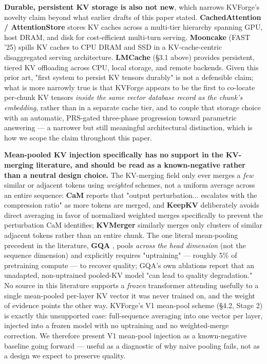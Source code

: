 \documentclass[10pt,twocolumn]{article}
\begin{document}
\textbf{Durable, persistent KV storage is also not new}, which narrows KVForge's novelty claim beyond what earlier drafts of this paper stated. \textbf{CachedAttention / AttentionStore} \cite{ref36} stores KV caches across a multi-tier hierarchy spanning GPU, host DRAM, and disk for cost-efficient multi-turn serving. \textbf{Mooncake} \cite{ref37} (FAST '25) spills KV caches to CPU DRAM and SSD in a KV-cache-centric disaggregated serving architecture. \textbf{LMCache} \cite{ref33} (\S{}3.1 above) provides persistent, tiered KV offloading across CPU, local storage, and remote backends. Given this prior art, "first system to persist KV tensors durably" is not a defensible claim; what is more narrowly true is that KVForge appears to be the first to co-locate per-chunk KV tensors \textit{inside the same vector database record as the chunk's embedding}, rather than in a separate cache tier, and to couple that storage choice with an automatic, PRS-gated three-phase progression toward parametric answering --- a narrower but still meaningful architectural distinction, which is how we scope the claim throughout this paper.


\textbf{Mean-pooled KV injection specifically has no support in the KV-merging literature, and should be read as a known-negative rather than a neutral design choice.} The KV-merging field only ever merges a \textit{few} similar or adjacent tokens using \textit{weighted} schemes, not a uniform average across an entire sequence: \textbf{CaM} \cite{ref40} reports that "output perturbation... escalates with the compression ratio" as more tokens are merged, and \textbf{KeepKV} \cite{ref42} deliberately avoids direct averaging in favor of normalized weighted merges specifically to prevent the perturbation CaM identifies; \textbf{KVMerger} \cite{ref41} similarly merges only clusters of similar adjacent tokens rather than an entire chunk. The one literal mean-pooling precedent in the literature, \textbf{GQA} \cite{ref43}, pools \textit{across the head dimension} (not the sequence dimension) and explicitly requires "uptraining" --- roughly 5\% of pretraining compute --- to recover quality; GQA's own ablations report that an unadapted, non-uptrained pooled-KV model "can lead to quality degradation." No source in this literature supports a \textit{frozen} transformer attending usefully to a single mean-pooled per-layer KV vector it was never trained on, and the weight of evidence points the other way. KVForge's V1 mean-pool scheme (\S{}4.2, Stage 2) is exactly this unsupported case: full-sequence averaging into one vector per layer, injected into a frozen model with no uptraining and no weighted-merge correction. We therefore present V1 mean-pool injection as a known-negative baseline going forward --- useful as a diagnostic of why naive pooling fails, not as a design we expect to preserve quality.
\end{document}
